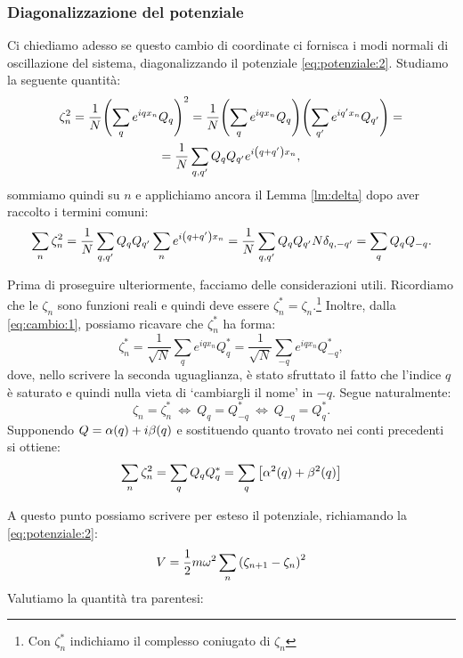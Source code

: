         \subsubsection{Diagonalizzazione del potenziale}
            Ci chiediamo adesso se questo cambio di coordinate ci fornisca i modi normali di oscillazione del sistema, diagonalizzando il potenziale \eqref{eq:potenziale:2}. Studiamo la seguente quantit\`a:
            \begin{multline*}
                \zeta_n^2=\frac{1}{N}\qty(\sum_q e^{iqx_n}Q_q)^2=\frac{1}{N}\qty(\sum_q e^{iqx_n}Q_q)\Biggl(\sum_{q'} e^{iq'x_n}Q_{q'}\Biggr)=\\=\frac{1}{N}\sum_{q,q'}Q_qQ_{q'}e^{i\qty(q+q')x_n},
            \end{multline*}
            sommiamo quindi su $n$ e applichiamo ancora il Lemma \ref{lm:delta} dopo aver raccolto i termini comuni: $$\sum_n\zeta_n^2=\frac{1}{N}\sum_{q,q'}Q_qQ_{q'}\sum_ne^{i\qty(q+q')x_n}=\frac{1}{N}\sum_{q,q'}Q_qQ_{q'}N\delta_{q,-q'}=\sum_qQ_qQ_{-q}.$$
            \par Prima di proseguire ulteriormente, facciamo delle considerazioni utili. Ricordiamo che le $\zeta_n$ sono funzioni reali e quindi deve essere $\zeta_n^*=\zeta_n$.\footnote{Con $\zeta_n^*$ indichiamo il complesso coniugato di $\zeta_n$} Inoltre, dalla \eqref{eq:cambio:1}, possiamo ricavare che $\zeta_n^*$ ha forma: $$\zeta_n^*=\frac{1}{\sqrt{N}}\sum_qe^{iqx_n}Q_q^*=\frac{1}{\sqrt{N}}\sum_{-q}e^{iqx_n}Q_{-q}^*,$$ dove, nello scrivere la seconda uguaglianza, \`e stato sfruttato il fatto che l'indice $q$ \`e saturato e quindi nulla vieta di `cambiargli il nome' in $-q$. Segue naturalmente:
            \begin{equation}
                \zeta_n=\zeta_n^*\ \iff\ Q_q=Q_{-q}^*\ \iff\ Q_{-q}=Q_q^*.
                \label{eq:QQ}
            \end{equation}
            Supponendo $Q=\alpha\qty(q)+i\beta\qty(q)$ e sostituendo quanto trovato nei conti precedenti si ottiene:
            \begin{equation}
                \sum_n\zeta_n^2=\sum_qQ_qQ_q^*=\sum_q\qty[\alpha^2\qty(q)+\beta^2\qty(q)]
                \label{eq:sommazetaquadro}
            \end{equation}
            \par A questo punto possiamo scrivere per esteso il potenziale, richiamando la \eqref{eq:potenziale:2}:
                $$V=\frac{1}{2}m\omega^2\sum_n\qty(\zeta_{n+1}-\zeta_n)^2$$
            Valutiamo la quantit\`a tra parentesi:
